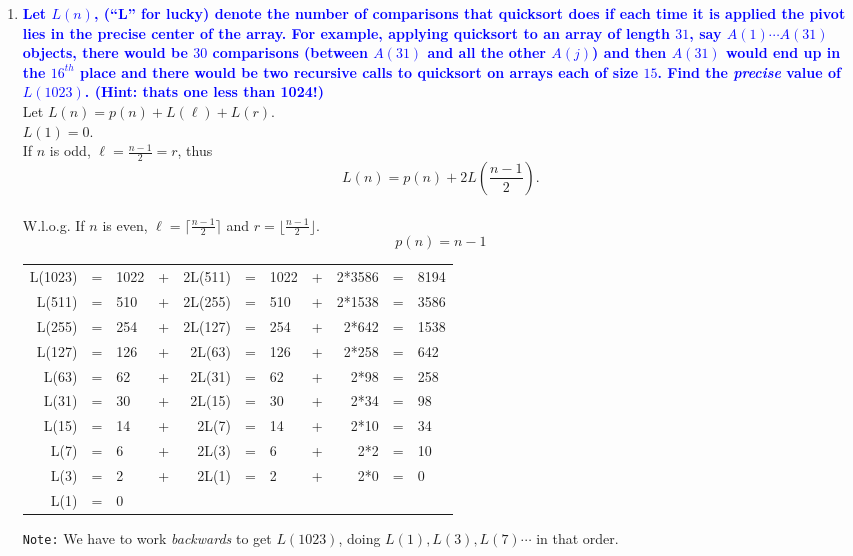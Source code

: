 \documentclass[11pt]{article}
\begin{document}
\begin{enumerate}
\item \textbf{\textcolor{blue}{Let $L(n)$, (``L'' for lucky) denote the number of comparisons that
quicksort does if each time it is applied the pivot lies in the precise center of the array. 
For example, applying quicksort to an array of length $31$, say $A(1)\cdots A(31)$ objects, 
there would be $30$ comparisons (between $A(31)$ and all the other $A(j)$) and then $A(31)$ 
would end up in the $16^{th}$ place and there would be two recursive calls to quicksort on 
arrays each of size $15$. Find the {\em precise} value of $L(1023)$. (Hint: thats one less than 1024!)}}
    \\ Let $L(n) = p(n) + L(\ell) + L(r)$.
    \\ $L(1) = 0$.
    \\ If $n$ is odd, $\ell = \frac{n-1}{2} = r$, thus
    \[ L(n) = p(n) + 2L(\frac{n-1}{2}).\]
    \\ W.l.o.g. If $n$ is even, $\ell = \lceil \frac{n-1}{2}\rceil$ and $r = \lfloor \frac{n-1}{2} \rfloor$.
    \[ p(n) = n-1 \]
    \begin{center}
    \begin{tabular}{rclcrclcrcl}
    L(1023) &=& 1022 &+& 2L(511) &=&1022 &+& 2*3586 &=& 8194\\
    L(511)  &=&  510 &+& 2L(255) &=& 510 &+& 2*1538 &=& 3586\\
    L(255)  &=&  254 &+& 2L(127) &=& 254 &+& 2*642  &=& 1538\\
    L(127)  &=&  126 &+& 2L(63)  &=& 126 &+& 2*258  &=& 642\\
    L(63)   &=&   62 &+& 2L(31)  &=&  62 &+& 2*98   &=& 258\\
    L(31)   &=&   30 &+& 2L(15)  &=&  30 &+& 2*34   &=& 98\\
    L(15)   &=&   14 &+& 2L(7)   &=&  14 &+& 2*10   &=& 34\\
    L(7)    &=&    6 &+& 2L(3)   &=&   6 &+& 2*2    &=& 10\\
    L(3)    &=&    2 &+& 2L(1)   &=&   2 &+& 2*0    &=& 0\\
    L(1)    &=&    0         
    \end{tabular}
    \end{center}
    {\tt Note:} We have to work {\em backwards} to get $L(1023)$, doing $L(1),L(3),L(7)\cdots$ in that order.  


\end{enumerate}
\end{document}
